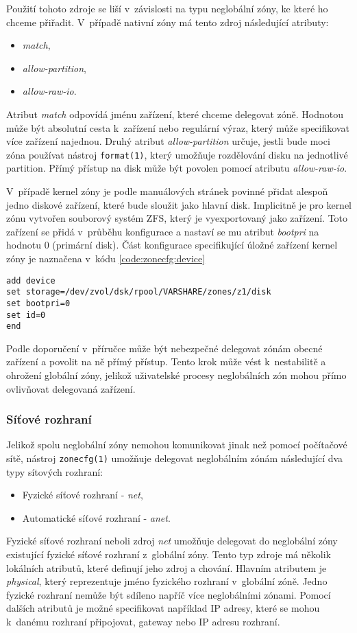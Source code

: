 Použití tohoto zdroje se liší v~závislosti na typu neglobální zóny, ke které ho chceme přiřadit. V~případě nativní zóny má tento
zdroj následující  atributy:
\begin{itemize}
 \item \textit{match},
 \item \textit{allow-partition},
 \item \textit{allow-raw-io}.
\end{itemize}
Atribut \textit{match} odpovídá jménu zařízení, které chceme delegovat zóně. Hodnotou může být absolutní cesta k~zařízení nebo
regulární výraz, který může specifikovat více zařízení najednou. Druhý atribut \textit{allow-partition} určuje, jestli 
bude moci zóna používat nástroj \verb|format(1)|, který umožňuje rozdělování disku na jednotlivé partition. Přímý přístup na disk
může být povolen pomocí atributu \textit{allow-raw-io}.

V~případě kernel zóny je podle manuálových stránek \cite{oracle:manpages:solaris-kz} povinné přidat alespoň jedno diskové zařízení,
které bude sloužit jako hlavní disk. Implicitně je pro kernel zónu vytvořen souborový systém ZFS, který je vyexportovaný jako
zařízení. Toto zařízení se přidá v~průběhu konfigurace a nastaví se mu atribut \textit{bootpri} na hodnotu 0 (primární disk).
Část konfigurace specifikující úložné zařízení kernel zóny je naznačena v~kódu \ref{code:zonecfg:device}
\begin{lstlisting}[caption={Konfigurace zařízení kernel zóny}, float, label={code:zonecfg:device}]
add device
set storage=/dev/zvol/dsk/rpool/VARSHARE/zones/z1/disk
set bootpri=0
set id=0
end
\end{lstlisting}
Podle doporučení v~příručce \cite{oracle:manpages:zonecfg} může být nebezpečné delegovat zónám obecné zařízení a povolit na ně přímý
přístup. Tento krok může vést k~nestabilitě a ohrožení globální zóny, jelikož uživatelské procesy neglobálních zón mohou
přímo ovlivňovat delegovaná zařízení.
\subsubsection{Síťové rozhraní}
\label{chapter:zones:configuration:resources:network}
Jelikož spolu neglobální zóny nemohou komunikovat jinak než pomocí počítačové sítě, nástroj \verb|zonecfg(1)| umožňuje delegovat
neglobálním zónám následující dva typy sítových rozhraní:
\begin{itemize}
 \item Fyzické síťové rozhraní - \textit{net},
 \item Automatické síťové rozhraní - \textit{anet}.
\end{itemize}
Fyzické síťové rozhraní neboli zdroj \textit{net} umožňuje delegovat do neglobální zóny existující fyzické síťové rozhraní
z~globální zóny. Tento typ zdroje má několik lokálních atributů, které definují jeho zdroj a chování. Hlavním atributem je
\textit{physical}, který reprezentuje jméno fyzického rozhraní v~globální zóně. Jedno fyzické rozhraní nemůže být sdíleno
napříč více neglobálními zónami. Pomocí dalších atributů je možné specifikovat například IP adresy, které se mohou k~danému 
rozhraní připojovat, gateway nebo IP adresu rozhraní. 

